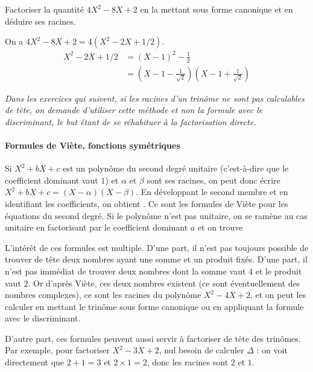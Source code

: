 \begin{exo}
Factoriser la quantité $4X^2-8X+2$ en la mettant sous forme canonique et en déduire ses racines. 
\begin{sol}
On a $4X^2-8X+2=4(X^2-2X+1/2)$.
\begin{align*}
X^2-2X+1/2 &= (X-1)^2 -\frac12\\
&= (X-1-\frac{1}{\sqrt 2})(X-1+\frac{1}{\sqrt 2})
\end{align*}
\end{sol}
\end{exo}

\vspace{1em}
\emph{Dans les exercices qui suivent, si les racines d'un trinôme ne sont pas calculables de tête, on demande d'utiliser cette méthode et non la formule avec le discriminant, le but étant de se réhabituer à la factorisation directe.}


\paragraph{Formules de Viète, fonctions symétriques}\hfill



Si $X^2+bX+c$ est un polynôme du second degré unitaire (c'est-à-dire que le coefficient dominant vaut $1$) et $\alpha$ et $\beta$ sont ses racines, on peut donc écrire $X^2+bX+c = (X-\alpha)(X-\beta)$. En développant le second membre et en identifiant les coefficients, on obtient . Ce sont les formules de Viète pour les équations du second degré. Si le polynôme n'est pas unitaire, on se ramène au cas unitaire en factorisant par le coefficient dominant $a$  et on trouve 


L'intérêt de ces formules est multiple. D'une part, il n'est pas toujours possible de trouver de tête deux nombres ayant une somme et un produit fixés.
 D'une part, il n'est pas immédiat de trouver deux nombres dont la somme vaut $4$ et le produit vaut $2$. Or d'après Viète, ces deux nombres existent (ce sont éventuellement des nombres complexes), ce sont les racines du polynôme $X^2-4X+2$, et on peut les calculer en mettant le trinôme sous forme canonique ou en appliquant la formule avec le discriminant.

D'autre part, ces formules peuvent aussi servir à factoriser de tête des trinômes. Par exemple, pour factoriser $X^2-3X+2$, nul besoin de calculer $\Delta$ : on voit directement que $2+1=3$ et $2\times 1=2$, donc les racines sont $2$ et $1$.

